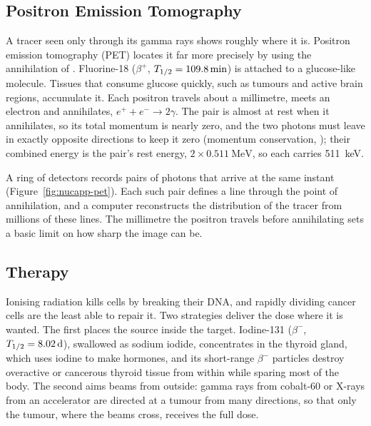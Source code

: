 \subsection{Positron Emission Tomography}

A tracer seen only through its gamma rays shows roughly where it is. Positron emission tomography (PET)
locates it far more precisely by using the annihilation of . Fluorine-18 ($\beta^+$,
$T_{1/2}=\SI{109.8}{min}$) is attached to a glucose-like molecule. Tissues that consume glucose quickly,
such as tumours and active brain regions, accumulate it. Each positron travels about a millimetre, meets
an electron and annihilates, $e^++e^-\to2\gamma$. The pair is almost at rest when it annihilates, so its
total momentum is nearly zero, and the two photons must leave in exactly opposite directions to keep it
zero (momentum conservation, ); their combined energy is the pair's rest energy,
$2\times\SI{0.511}{\MeV}$, so each carries \SI{511}{keV}.

A ring of detectors records pairs of photons that arrive at the same instant (Figure~\ref{fig:nucapp-pet}).
Each such pair defines a line through the point of annihilation, and a computer reconstructs the
distribution of the tracer from millions of these lines. The millimetre the positron travels before
annihilating sets a basic limit on how sharp the image can be.

\begin{figure}[htbp]
\centering
{}
\end{figure}

\subsection{Therapy}

Ionising radiation kills cells by breaking their DNA, and rapidly dividing cancer cells are the least able
to repair it. Two strategies deliver the dose where it is wanted. The first places the source inside the
target. Iodine-131 ($\beta^-$, $T_{1/2}=\SI{8.02}{d}$), swallowed as sodium iodide, concentrates in the
thyroid gland, which uses iodine to make hormones, and its short-range $\beta^-$ particles destroy
overactive or cancerous thyroid tissue from within while sparing most of the body. The second aims beams
from outside: gamma rays from cobalt-60 or X-rays from an accelerator are directed at a tumour from many
directions, so that only the tumour, where the beams cross, receives the full dose.


